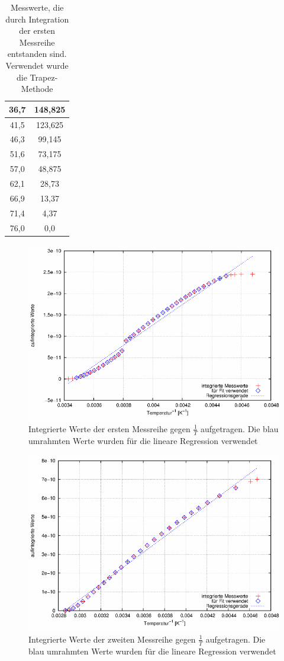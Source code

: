 \begin{table}[htbp]
\begin{minipage}[t]{0.45\textwidth}
\begin{tabular}{c|c}
36,7 &148,825\\\hline
41,5 &123,625\\\hline
46,3 &99,145\\\hline
51,6 &73,175\\\hline
57,0 &48,875\\\hline
62,1 &28,73\\\hline
66,9 &13,37\\\hline
71,4 &4,37\\\hline
76,0 &0,0\\\hline
\end{tabular}
\end{minipage}
\caption{Messwerte, die durch Integration der ersten Messreihe entstanden sind. Verwendet wurde die Trapez-Methode}
\label{tab_int2}
\end{table}

\begin{figure}[H]
\includegraphics[scale=0.8]{../gnu/relax31.pdf}
\caption{Integrierte Werte der ersten Messreihe gegen $\frac{1}{T}$ aufgetragen. Die blau umrahmten Werte wurden für die lineare Regression verwendet}
\label{pic_int1}
\end{figure}
\begin{figure}[H]
\includegraphics[scale=0.8]{../gnu/relax32.pdf}
\caption{Integrierte Werte der zweiten Messreihe gegen $\frac{1}{T}$ aufgetragen. Die blau umrahmten Werte wurden für die lineare Regression verwendet}
\label{pic_int2}
\end{figure}

